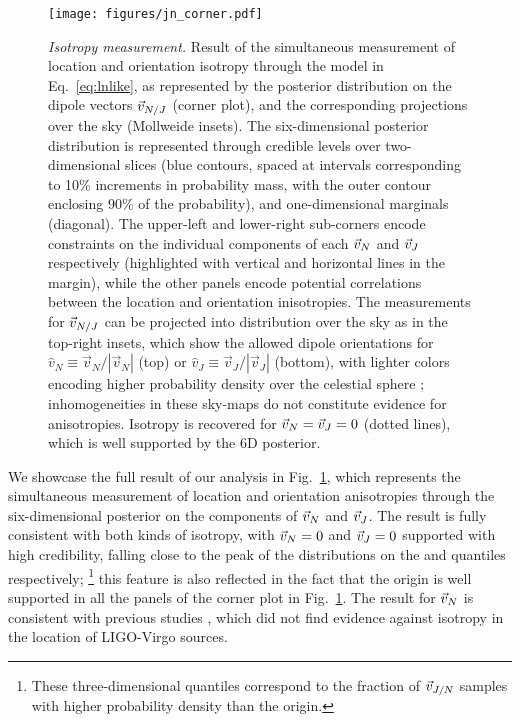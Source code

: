 \documentclass[aps,prd,twocolumn,superscriptaddress,preprintnumbers,floatfix,nofootinbib]{revtex4-2}
\newcommand{\clJ}{}
\newcommand{\clN}{}
\begin{document}
\begin{figure*}[p]
\texttt{[image: figures/jn\_corner.pdf]}
\caption{\emph{Isotropy measurement.} Result of the simultaneous measurement of location and orientation isotropy through the model in Eq.~\eqref{eq:lnlike}, as represented by the posterior distribution on the dipole vectors $\vec{v}_{N/J}$ (corner plot), and the corresponding projections over the sky (Mollweide insets).
The six-dimensional posterior distribution is represented through credible levels over two-dimensional slices (blue contours, spaced at intervals corresponding to 10\% increments in probability mass, with the outer contour enclosing 90\% of the probability), and one-dimensional marginals (diagonal).
The upper-left and lower-right sub-corners encode constraints on the individual components of each $\vec{v}_{N}$ and $\vec{v}_{J}$ respectively (highlighted with vertical and horizontal lines in the margin), while the other panels encode potential correlations between the location and orientation inisotropies.
The measurements for $\vec{v}_{N/J}$ can be projected into distribution over the sky as in the top-right insets, which show the allowed dipole orientations for $\hat{v}_N \equiv \vec{v}_N / |\vec{v}_N|$ (top) or $\hat{v}_J \equiv \vec{v}_J / |\vec{v}_J|$ (bottom), with lighter colors encoding higher probability density over the celestial sphere \cite{skymap,Singer:2016eax,Singer:2016erz}; inhomogeneities in these sky-maps do not constitute evidence for anisotropies.
Isotropy is recovered for $\vec{v}_{N} = \vec{v}_{J} = 0$ (dotted lines), which is well supported by the 6D posterior.
}
\label{fig:jn_corner}
\end{figure*}

We showcase the full result of our analysis in Fig.~\ref{fig:jn_corner}, which represents the simultaneous measurement of location and orientation anisotropies through the six-dimensional posterior on the components of $\vec{v}_{N}$ and $\vec{v}_{J}$.
The result is fully consistent with both kinds of isotropy, with $\vec{v}_{N} = 0$ and $\vec{v}_{J} = 0$ supported with high credibility, falling close to the peak of the distributions on the \clN and \clJ quantiles respectively;%
\footnote{These three-dimensional quantiles correspond to the fraction of $\vec{v}_{J/N}$ samples with higher probability density than the origin.}
 this feature is also reflected in the fact that the origin is well supported in all the panels of the corner plot in Fig.~\ref{fig:jn_corner}.
The result for $\vec{v}_{N}$ is consistent with previous studies \cite{Essick:2022slj}, which did not find evidence against isotropy in the location of LIGO-Virgo sources.
\end{document}
